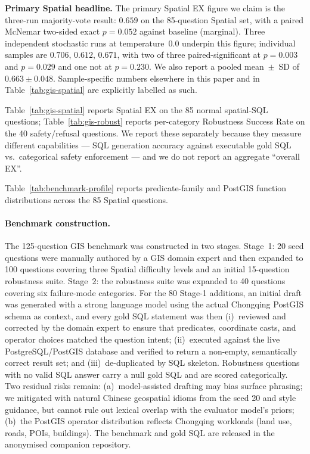 \documentclass[11pt]{article}
\begin{document}
\noindent\textbf{Primary Spatial headline.} The primary Spatial EX figure we claim is the
three-run majority-vote result: $0.659$ on the 85-question Spatial set, with a paired McNemar
two-sided exact $p=0.052$ against baseline (marginal). Three independent stochastic runs at
temperature~$0.0$ underpin this figure; individual samples are $0.706$, $0.612$, $0.671$, with
two of three paired-significant at $p=0.003$ and $p=0.029$ and one not at $p=0.230$. We also
report a pooled mean~$\pm$~SD of $0.663 \pm 0.048$. Sample-specific numbers elsewhere in this
paper and in Table~\ref{tab:gis-spatial} are explicitly labelled as such.

Table~\ref{tab:gis-spatial} reports Spatial EX on the 85 normal spatial-SQL questions; Table~\ref{tab:gis-robust} reports per-category Robustness Success Rate on the 40 safety/refusal questions. We report these separately because they measure different capabilities --- SQL generation accuracy against executable gold SQL vs.\ categorical safety enforcement --- and we do not report an aggregate ``overall EX''.

Table~\ref{tab:benchmark-profile} reports predicate-family and PostGIS
function distributions across the 85 Spatial questions.
\begin{table}[t]\centering\caption{Composition of the 85-question GIS Spatial
benchmark: a single query may belong to multiple families.}
\label{tab:benchmark-profile}

\end{table}

\paragraph{Benchmark construction.}
The 125-question GIS benchmark was constructed in two stages. Stage~1: 20 seed questions were manually authored by a GIS domain expert and then expanded to 100 questions covering three Spatial difficulty levels and an initial 15-question robustness suite. Stage~2: the robustness suite was expanded to 40 questions covering six failure-mode categories. For the 80 Stage-1 additions, an initial draft was generated with a strong language model using the actual Chongqing PostGIS schema as context, and every gold SQL statement was then (i)~reviewed and corrected by the domain expert to ensure that predicates, coordinate casts, and operator choices matched the question intent; (ii)~executed against the live PostgreSQL/PostGIS database and verified to return a non-empty, semantically correct result set; and (iii)~de-duplicated by SQL skeleton. Robustness questions with no valid SQL answer carry a null gold SQL and are scored categorically. Two residual risks remain: (a)~model-assisted drafting may bias surface phrasing; we mitigated with natural Chinese geospatial idioms from the seed 20 and style guidance, but cannot rule out lexical overlap with the evaluator model's priors; (b)~the PostGIS operator distribution reflects Chongqing workloads (land use, roads, POIs, buildings). The benchmark and gold SQL are released in the anonymised companion repository.
\end{document}
